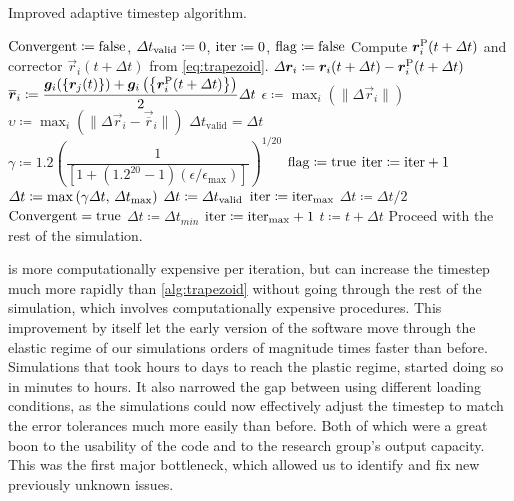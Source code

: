 \begin{algorithm}
    \caption{Improved adaptive timestep algorithm.}
    \label{alg:trapezoid_improved}
    \begin{algorithmic}
        \State $\textrm{Convergent} \coloneqq \textrm{false}$, $\Delta t_{\textrm{valid}} \coloneqq 0$, $\textrm{iter} \coloneqq 0$, $\textrm{flag} \coloneqq \textrm{false}$
        \State Compute $\vec{r}_i^{\rvar{P}}(t + \Delta t)$ and corrector $\vec{r}_i(t + \Delta t)$ from \cref{eq:trapezoid}.
        \State $\Delta \vec{r}_i \coloneqq \vec{r}_i(t + \Delta t) - \vec{r}_i^{\rvar{P}}(t + \Delta t)$
        \State $\vec{\overline{r}}_i \coloneqq \dfrac{\vec{g}_i(\left\{\vec{r}_j(t)\right\}) + \vec{g}_i\left(\left\{\vec{r}_i^{\rvar{P}}(t + \Delta t)\right\}\right)}{2}\Delta t$
        \State $\epsilon \coloneqq \max_i\left(\lVert \Delta \vec{r}_i \rVert \right)$
        \State $\upsilon \coloneqq \max_i\left(\lVert \Delta \vec{r}_i - \vec{\overline{r}}_i \rVert\right)$
        \State $\Delta t_{\textrm{valid}} = \Delta t$
        \State $\gamma \coloneqq 1.2\left(\dfrac{1}{\left[1 + (1.2^{20} - 1) (\epsilon / \epsilon_{\textrm{max}})\right]}\right)^{1/20}$
        \State $\textrm{flag} \coloneqq \textrm{true}$
        \State $\textrm{iter} \coloneqq \textrm{iter} + 1$
        \State $\Delta t \coloneqq \max\left(\gamma \Delta t,\, \Delta t_{\textrm{max}}\right)$
        \Else
        \State $\Delta t \coloneqq \Delta t_{\textrm{valid}}$
        \State $\textrm{iter} \coloneqq \textrm{iter}_{\textrm{max}}$
        \Else
        \State $\Delta t \coloneqq \Delta t / 2$
        \EndIf
        \EndIf
        \State $\textrm{Convergent} = \textrm{true}$
        \EndIf
        \State $\Delta t \coloneqq \Delta t_{min}$
        \State $\textrm{iter} \coloneqq \textrm{iter}_{\textrm{max}} + 1$
        \EndIf
        \EndWhile
        \State $t \coloneqq t + \Delta t$
        \State Proceed with the rest of the simulation.
    \end{algorithmic}
\end{algorithm}

 is more computationally expensive per iteration, but can increase the timestep much more rapidly than \cref{alg:trapezoid} without going through the rest of the simulation, which involves computationally expensive procedures. This improvement by itself let the early version of the software move through the elastic regime of our simulations orders of magnitude times faster than before. Simulations that took hours to days to reach the plastic regime, started doing so in minutes to hours. It also narrowed the gap between using different loading conditions, as the simulations could now effectively adjust the timestep to match the error tolerances much more easily than before. Both of which were a great boon to the usability of the code and to the research group's output capacity. This was the first major bottleneck, which allowed us to identify and fix new previously unknown issues.

